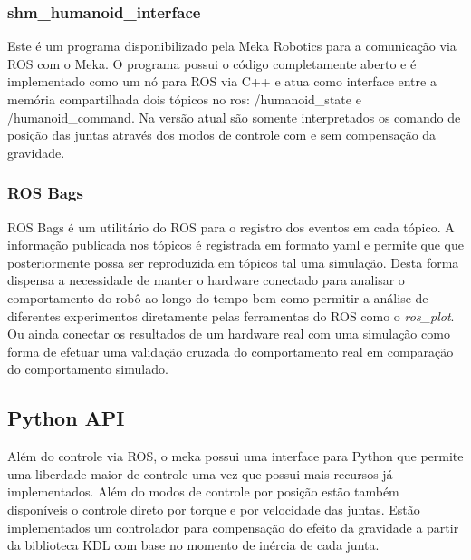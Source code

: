 \subsubsection{shm\_humanoid\_interface}

Este é um programa disponibilizado pela Meka Robotics para a comunicação via ROS com o Meka. O programa possui o código completamente aberto e é implementado como um nó para ROS via C++ e atua como interface entre a memória compartilhada dois tópicos no ros: /humanoid\_state e /humanoid\_command. Na versão atual são somente interpretados os comando de posição das juntas através dos modos de controle com e sem compensação da gravidade.

\subsubsection{ROS Bags}

ROS Bags é um utilitário do ROS para o registro dos eventos em cada tópico. A informação publicada nos tópicos é registrada em formato yaml e permite que que posteriormente possa ser reproduzida em tópicos tal uma simulação. Desta forma dispensa a necessidade de manter o hardware conectado para analisar o comportamento do robô ao longo do tempo bem como permitir a análise de diferentes experimentos diretamente pelas ferramentas do ROS como o \textit{ros\_plot}. Ou ainda conectar os resultados de um hardware real com uma simulação como forma de efetuar uma validação cruzada do comportamento real em comparação do comportamento simulado.

\subsection{Python API}

Além do controle via ROS, o meka possui uma interface para Python que permite uma liberdade maior de controle uma vez que possui mais recursos já implementados. Além do modos de controle por posição estão também disponíveis o controle direto por torque e por velocidade das juntas. Estão implementados um controlador para compensação do efeito da gravidade a partir da biblioteca KDL com base no momento de inércia de cada junta.



